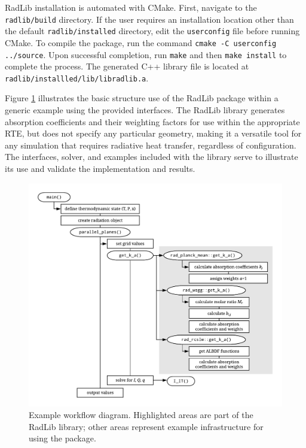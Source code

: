 \documentclass[preprint,12pt]{elsarticle}
\begin{document}
RadLib installation is automated with CMake. First, navigate to the \texttt{radlib/build} directory. If the user requires an installation location other than the default \texttt{radlib/installed} directory, edit the \texttt{user\textunderscore config} file before running CMake. To compile the package, run the command \texttt{cmake -C user\textunderscore config ../source}. Upon successful completion, run \texttt{make} and then \texttt{make install} to complete the process. The generated C++ library file is located at \texttt{radlib/installled/lib/libradlib.a}. 

Figure \ref{fig:flowchart} illustrates the basic structure use of the RadLib package within a generic example using the provided interfaces. The RadLib library generates absorption coefficients and their weighting factors for use within the appropriate RTE, but does not specify any particular geometry, making it a versatile tool for any simulation that requires radiative heat transfer, regardless of configuration. The interfaces, solver, and examples included with the library serve to illustrate its use and validate the implementation and results. 
%
\begin{figure}
	\begin{center}
        \includegraphics[width=\textwidth]{fig_radlib_structure.pdf}
	\end{center}
	\caption{Example workflow diagram. Highlighted areas are part of the RadLib library; other areas represent example infrastructure for using the package.}
\label{fig:flowchart}
\end{figure}
%
\end{document}
